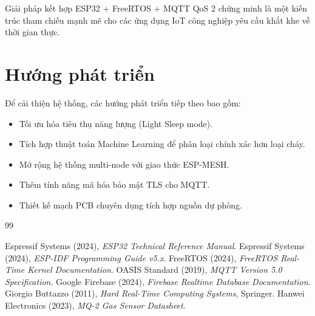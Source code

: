 \documentclass[12pt,a4paper]{report}
\begin{document}
Giải pháp kết hợp ESP32 + FreeRTOS + MQTT QoS 2 chứng minh là một kiến trúc tham chiếu mạnh mẽ cho các ứng dụng IoT công nghiệp yêu cầu khắt khe về thời gian thực.

\section*{Hướng phát triển}
Để cải thiện hệ thống, các hướng phát triển tiếp theo bao gồm:
\begin{itemize}
    \item Tối ưu hóa tiêu thụ năng lượng (Light Sleep mode).
    \item Tích hợp thuật toán Machine Learning để phân loại chính xác hơn loại cháy.
    \item Mở rộng hệ thống multi-node với giao thức ESP-MESH.
    \item Thêm tính năng mã hóa bảo mật TLS cho MQTT.
    \item Thiết kế mạch PCB chuyên dụng tích hợp nguồn dự phòng.
\end{itemize}

\begin{thebibliography}{99}

 Espressif Systems (2024), \textit{ESP32 Technical Reference Manual}.
 Espressif Systems (2024), \textit{ESP-IDF Programming Guide v5.x}.
 FreeRTOS (2024), \textit{FreeRTOS Real-Time Kernel Documentation}.
 OASIS Standard (2019), \textit{MQTT Version 5.0 Specification}.
 Google Firebase (2024), \textit{Firebase Realtime Database Documentation}.
 Giorgio Buttazzo (2011), \textit{Hard Real-Time Computing Systems}, Springer.
 Hanwei Electronics (2023), \textit{MQ-2 Gas Sensor Datasheet}.

\end{thebibliography}
\end{document}
